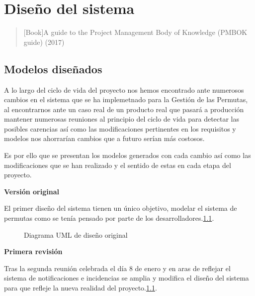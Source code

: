 \chapter{Diseño del sistema}

\begin{quotation}[Book]{A guide to the Project Management Body of Knowledge (PMBOK guide) (2017)}

\end{quotation}

\begin{abstract}
Se comentará el diseño del sistema desde el punto de vista de los actores implicados así como de los modelos que nutriran la implementación a posteriori del sistema.
\end{abstract}

\clearpage

\section{Modelos diseñados}

A lo largo del ciclo de vida del proyecto nos hemos encontrado ante numerosos cambios en el sistema que se ha implemetnado para la Gestión de las Permutas, al encontrarnos ante un caso real de un producto real que pasará a producción mantener numerosas reuniones al principio del ciclo de vida para detectar las posibles carencias así como las modificaciones pertinentes en los requisitos y modelos nos ahorrarían cambios que a futuro serían más costosos. 

Es por ello que se presentan los modelos generados con cada cambio así como las modificaciones que se han realizado y el sentido de estas en cada etapa del proyecto.

\textbf{Versión original}


El primer diseño del sistema tienen un único objetivo, modelar el sistema de permutas como se tenía pensado por parte de los desarrolladores.\ref{fig:diseno00}.

\begin{figure}[htbp]
\begin{center}

\caption{Diagrama UML de diseño original}
\label{fig:diseno00}
\end{center}
\end{figure}

\textbf{Primera revisión}


Tras la segunda reunión celebrada el día 8 de enero y en aras de reflejar el sistema de notificaciones e incidencias se amplia y modifica el diseño del sistema para que refleje la nueva realidad del proyecto.\ref{fig:diseno00}.

